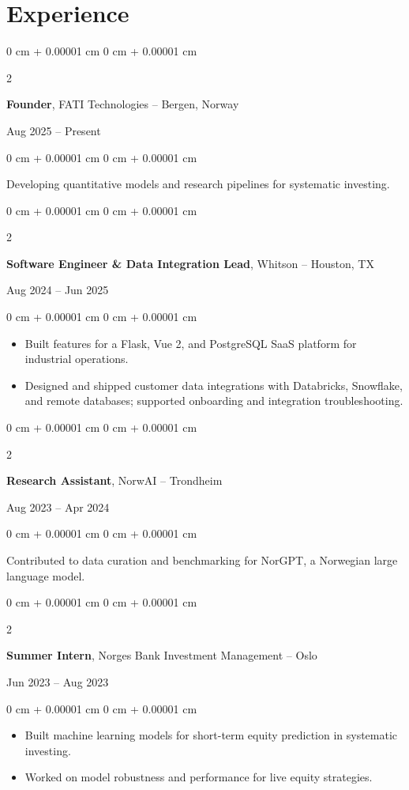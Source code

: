 \documentclass[10pt, letterpaper]{article}
\newenvironment{highlights}{
    \begin{itemize}[
        topsep=0.10 cm,
        parsep=0.10 cm,
        partopsep=0pt,
        itemsep=0pt,
        leftmargin=0 cm + 10pt
    ]
}{
    \end{itemize}
} %
\newenvironment{onecolentry}{
    \begin{adjustwidth}{
        0 cm + 0.00001 cm
    }{
        0 cm + 0.00001 cm
    }
}{
    \end{adjustwidth}
} %
\newenvironment{twocolentry}[2][]{
    \onecolentry
    \def\secondColumn{#2}
    \setcolumnwidth{\fill, 4.5 cm}
    \begin{paracol}{2}
}{
    \switchcolumn \raggedleft \secondColumn
    \end{paracol}
    \endonecolentry
} %
\begin{document}
\section{Experience}

\begin{twocolentry}{Aug 2025 – Present}
    \textbf{Founder}, FATI Technologies – Bergen, Norway
\end{twocolentry}
\begin{onecolentry}
    Developing quantitative models and research pipelines for systematic investing.
\end{onecolentry}

\vspace{0.2 cm}
\begin{twocolentry}{Aug 2024 – Jun 2025}
    \textbf{Software Engineer \& Data Integration Lead}, Whitson – Houston, TX
\end{twocolentry}
\begin{onecolentry}
    \begin{highlights}
        \item Built features for a Flask, Vue 2, and PostgreSQL SaaS platform for industrial operations.
        \item Designed and shipped customer data integrations with Databricks, Snowflake, and remote databases; supported onboarding and integration troubleshooting.
    \end{highlights}
\end{onecolentry}

\vspace{0.2 cm}
\begin{twocolentry}{Aug 2023 – Apr 2024}
    \textbf{Research Assistant}, NorwAI – Trondheim
\end{twocolentry}
\begin{onecolentry}
    Contributed to data curation and benchmarking for NorGPT, a Norwegian large language model.
\end{onecolentry}

\vspace{0.2 cm}
\begin{twocolentry}{Jun 2023 – Aug 2023}
    \textbf{Summer Intern}, Norges Bank Investment Management – Oslo
\end{twocolentry}
\begin{onecolentry}
    \begin{highlights}
        \item Built machine learning models for short-term equity prediction in systematic investing.
        \item Worked on model robustness and performance for live equity strategies.
    \end{highlights}
\end{onecolentry}
\end{document}

